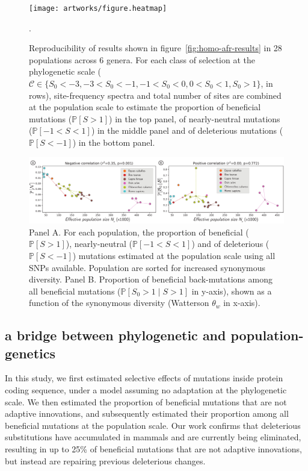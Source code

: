 \documentclass{article}
\newcommand{\proba}{\mathbb{P}}
\newcommand{\Sphy}{S_{0}}
\newcommand{\Sphyclass}{\mathcal{C}}
\newcommand{\divStrongDel}{\Sphy < -3}
\newcommand{\divDel}{-3 < \Sphy < -1}
\newcommand{\divWeakDel}{-1 < \Sphy < 0}
\newcommand{\divWeakAdv}{0 < \Sphy < 1}
\newcommand{\divAdv}{ \Sphy > 1}
\newcommand{\given}{\mid}
\newcommand{\Spop}{S}
\newcommand{\polyDel}{\Spop < -1}
\newcommand{\polyNeutral}{-1 < \Spop < 1}
\newcommand{\polyAdv}{ \Spop > 1}
\newcommand{\PpolyDel}{\proba \left[ \polyDel \right]}
\newcommand{\PpolyNeutral}{\proba \left[ \polyNeutral \right]}
\newcommand{\PpolyAdv}{\proba \left[ \polyAdv \right]}
\begin{document}
    \begin{figure}[!ht]
        \centering
        \texttt{[image: artworks/figure.heatmap]}
        \caption{
            Reproducibility of results shown in figure~\ref{fig:homo-afr-results} in 28 populations across 6 genera.
            For each class of selection at the phylogenetic scale ($\Sphyclass \in \{ \divStrongDel, \divDel,  \divWeakDel,  \divWeakAdv, \divAdv \}$, in rows), site-frequency spectra and total number of sites are combined at the population scale to estimate the proportion of beneficial mutations ($\PpolyAdv$) in the top panel, of nearly-neutral mutations ($\PpolyNeutral$) in the middle panel and of deleterious mutations ($\PpolyDel$) in the bottom panel.
        }.
        \label{fig:heatmap}
    \end{figure}

    \begin{figure}[!ht]
        \centering
        \includegraphics[width=\textwidth, page=1] {artworks/figure.diversity}
        \caption{
            Panel A. For each population, the proportion of beneficial ($\PpolyAdv$), nearly-neutral ($\PpolyNeutral$) and of deleterious ($\PpolyDel$) mutations estimated at the population scale using all SNPs available.
            Population are sorted for increased synonymous diversity.
            Panel B. Proportion of beneficial back-mutations among all beneficial mutations ($\mathbb{P} [ \Sphy > 1  \given  \Spop > 1]$ in y-axis), shown as a function of the synonymous diversity (Watterson $\theta_w$ in x-axis).
        }
        \label{fig:diversity}
    \end{figure}

    \subsection*{a bridge between phylogenetic and population-genetics}
    In this study, we first estimated selective effects of mutations inside protein coding sequence, under a model assuming no adaptation at the phylogenetic scale.
    We then estimated the proportion of beneficial mutations that are not adaptive innovations, and subsequently estimated their proportion among all beneficial mutations at the population scale.
    Our work confirms that deleterious substitutions have accumulated in mammals and are currently being eliminated, resulting in up to 25\% of beneficial mutations that are not adaptive innovations, but instead are repairing previous deleterious changes.
\end{document}
